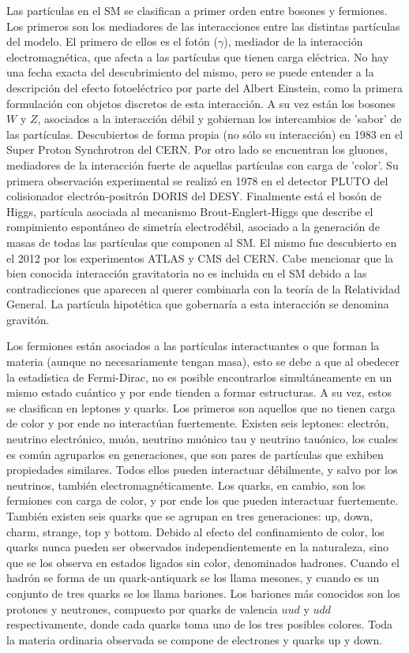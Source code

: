 Las partículas en el SM se clasifican a primer orden entre bosones y fermiones. Los primeros son los mediadores de las interacciones entre las distintas partículas del modelo. El primero de ellos es el fotón ($\gamma$), mediador de la interacción electromagnética, que afecta a las partículas que tienen carga eléctrica. No hay una fecha exacta del descubrimiento del mismo, pero se puede entender a la descripción del efecto fotoeléctrico por parte del Albert Einstein, como la primera formulación con objetos discretos de esta interacción. A su vez están los bosones $W$ y $Z$, asociados a la interacción débil y gobiernan los intercambios de 'sabor' de las partículas. Descubiertos de forma propia (no sólo su interacción) en 1983 en el Super Proton Synchrotron del CERN. Por otro lado se encuentran los gluones, mediadores de la interacción fuerte de aquellas partículas con carga de 'color'. Su primera observación experimental se realizó en 1978 en el detector PLUTO del colisionador electrón-positrón DORIS del DESY. Finalmente está el bosón de Higgs, partícula asociada al mecanismo Brout-Englert-Higgs que describe el rompimiento espontáneo de simetría electrodébil, asociado a la generación de masas de todas las partículas que componen al SM. El mismo fue descubierto en el 2012 por los experimentos ATLAS y CMS del CERN. Cabe mencionar que la bien conocida interacción gravitatoria no es incluida en el SM debido a las contradicciones que aparecen al querer combinarla con la teoría de la Relatividad General. La partícula hipotética que gobernaría a esta interacción se denomina gravitón.

Los fermiones están asociados a las partículas interactuantes o que forman la materia (aunque no necesariamente tengan masa), esto se debe a que al obedecer la estadística de Fermi-Dirac, no es posible encontrarlos simultáneamente en un mismo estado cuántico y por ende tienden a formar estructuras. A su vez, estos se clasifican en leptones y quarks. Los primeros son aquellos que no tienen carga de color y por ende no interactúan fuertemente. Existen seis leptones: electrón, neutrino electrónico, muón, neutrino muónico tau y neutrino tauónico, los cuales es común agruparlos en generaciones, que son pares de partículas que exhiben propiedades similares. Todos ellos pueden interactuar débilmente, y salvo por los neutrinos, también electromagnéticamente. Los quarks, en cambio, son los fermiones con carga de color, y por ende los que pueden interactuar fuertemente. También existen seis quarks que se agrupan en tres generaciones: up, down, charm, strange, top y bottom. Debido al efecto del confinamiento de color, los quarks nunca pueden ser observados independientemente en la naturaleza, sino que se los observa en estados ligados sin color, denominados hadrones. Cuando el hadrón se forma de un quark-antiquark se los llama mesones, y cuando es un conjunto de tres quarks se los llama bariones. Los bariones más conocidos son los protones y neutrones, compuesto por quarks de valencia $uud$ y $udd$ respectivamente, donde cada quarks toma uno de los tres posibles colores. Toda la materia ordinaria observada se compone de electrones y quarks up y down.


